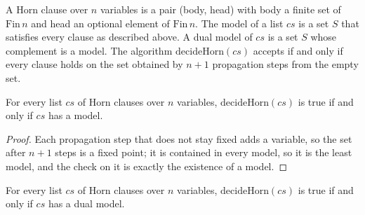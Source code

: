 \begin{definition}
  \label{def:structure-horn}
  \leanok
  A Horn clause over $n$ variables is a pair (body, head) with body a finite set of $\mathrm{Fin}\,n$
  and head an optional element of $\mathrm{Fin}\,n$. The model of a list $cs$ is a set $S$ that
  satisfies every clause as described above. A dual model of $cs$ is a set $S$ whose complement is
  a model. The algorithm $\mathrm{decideHorn}(cs)$ accepts if and only if every clause holds on the
  set obtained by $n + 1$ propagation steps from the empty set.
  \own{}
\end{definition}

\begin{theorem}
  \label{thm:structure-horn-correcto}
  \leanok
  For every list $cs$ of Horn clauses over $n$ variables, $\mathrm{decideHorn}(cs)$ is true if and
  only if $cs$ has a model.
\end{theorem}

\begin{proof}
  \leanok
  Each propagation step that does not stay fixed adds a variable, so the set after $n + 1$ steps is
  a fixed point; it is contained in every model, so it is the least model, and the check on it is
  exactly the existence of a model.
\end{proof}

\begin{theorem}
  \label{thm:structure-dual-correcto}
  \leanok
  For every list $cs$ of Horn clauses over $n$ variables, $\mathrm{decideHorn}(cs)$ is true if and
  only if $cs$ has a dual model.
\end{theorem}

